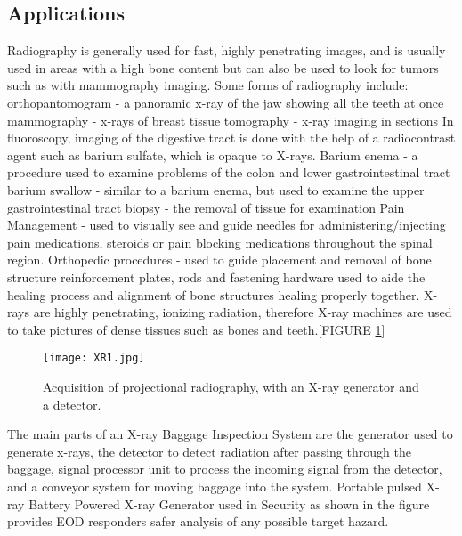 \documentclass[12pt]{article}
\begin{document}
\subsection{Applications}
Radiography is generally used for fast, highly penetrating images, and is usually used in areas with a high bone content but can also be used to look for tumors such as with mammography imaging.
Some forms of radiography include: orthopantomogram - a panoramic x-ray of the jaw showing all the teeth at once mammography - x-rays of breast tissue tomography - x-ray imaging in sections In fluoroscopy, imaging of the digestive tract is done with the help of a radiocontrast agent such as barium sulfate, which is opaque to X-rays.
Barium enema - a procedure used to examine problems of the colon and lower gastrointestinal tract barium swallow - similar to a barium enema, but used to examine the upper gastrointestinal tract biopsy - the removal of tissue for examination Pain Management - used to visually see and guide needles for administering/injecting pain medications, steroids or pain blocking medications throughout the spinal region.
Orthopedic procedures - used to guide placement and removal of bone structure reinforcement plates, rods and fastening hardware used to aide the healing process and alignment of bone structures healing properly together.
X-rays are highly penetrating, ionizing radiation, therefore X-ray machines are used to take pictures of dense tissues such as bones and teeth.[FIGURE \ref{fig_XR1}]
\begin{figure}[h]
\centering
\texttt{[image: XR1.jpg]}
\caption{Acquisition of projectional radiography, with an X-ray generator and a detector.}
\label{fig_XR1}
\end{figure}
The main parts of an X-ray Baggage Inspection System are the generator used to generate x-rays, the detector to detect radiation after passing through the baggage, signal processor unit to process the incoming signal from the detector, and a conveyor system for moving baggage into the system.
Portable pulsed X-ray Battery Powered X-ray Generator used in Security as shown in the figure provides EOD responders safer analysis of any possible target hazard.
\clearpage
\end{document}
